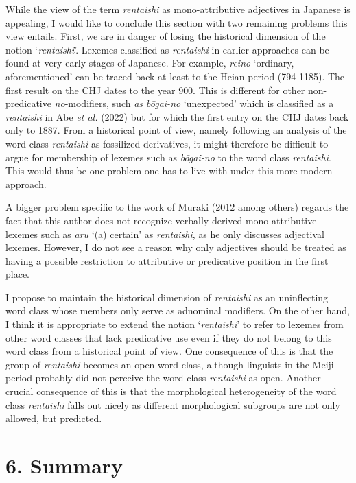 \documentclass[output=paper]{langscibook}
\begin{document}
While the view of the term \textit{rentaishi} as mono-attributive adjectives in Japanese is appealing, I would like to conclude this section with two remaining problems this view entails. First, we are in danger of losing the historical dimension of the notion ‘\textit{rentaishi}’. Lexemes classified as \textit{rentaishi} in earlier approaches can be found at very early stages of Japanese. For example, \textit{reino} ‘ordinary, aforementioned’ can be traced back at least to the Heian-period (794-1185). The first result on the CHJ dates to the year 900. This is different for other non-predicative \textit{no}{}-modifiers, such \textit{as bōgai-no} ‘unexpected’ which is classified as a \textit{rentaishi} in Abe \textit{et al.} (2022) but for which the first entry on the CHJ dates back only to 1887. From a historical point of view, namely following an analysis of the word class \textit{rentaishi} as fossilized derivatives, it might therefore be difficult to argue for membership of lexemes such as \textit{bōgai-no} to the word class \textit{rentaishi}. This would thus be one problem one has to live with under this more modern approach.

A bigger problem specific to the work of Muraki (2012 among others) regards the fact that this author does not recognize verbally derived mono-attributive lexemes such as \textit{aru} ‘(a) certain’ as \textit{rentaishi}, as he only discusses adjectival lexemes. However, I do not see a reason why only adjectives should be treated as having a possible restriction to attributive or predicative position in the first place.

I propose to maintain the historical dimension of \textit{rentaishi} as an uninflecting word class whose members only serve as adnominal modifiers. On the other hand, I think it is appropriate to extend the notion ‘\textit{rentaishi}’ to refer to lexemes from other word classes that lack predicative use even if they do not belong to this word class from a historical point of view. One consequence of this is that the group of \textit{rentaishi} becomes an open word class, although linguists in the Meiji-period probably did not perceive the word class \textit{rentaishi} as open. Another crucial consequence of this is that the morphological heterogeneity of the word class \textit{rentaishi} falls out nicely as different morphological subgroups are not only allowed, but predicted.

\section{6. Summary}
\end{document}
